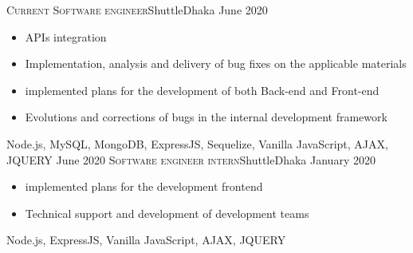 
\begin{experiences}
  \experience
    {\textsc{Current}}   {\textsc{Software engineer}}{Shuttle}{Dhaka}
    {June 2020} {
                      \begin{itemize}
                        \item APIs integration
                        \item Implementation, analysis and delivery of bug fixes on the applicable materials 
                        \item  implemented plans for the development of both Back-end and Front-end
                        \item Evolutions and corrections of bugs in the internal development framework      
                      \end{itemize}
                    }
                    {Node.js, MySQL, MongoDB, ExpressJS, Sequelize, Vanilla JavaScript, AJAX, JQUERY}
  \emptySeparator
  \experience
    {June 2020} {\textsc{Software engineer intern}}{Shuttle}{Dhaka}
    {January 2020}    {
                      \begin{itemize}
                        \item implemented plans for the development frontend
                        \item Technical support and development of development teams
                      \end{itemize}
                    }
                    {Node.js, ExpressJS, Vanilla JavaScript, AJAX, JQUERY}
  \emptySeparator
\end{experiences}
